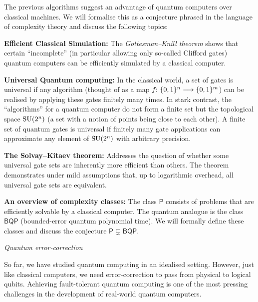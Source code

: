 \documentclass[a4paper, oneside, 12pt]{amsart}
\newcommand*{\Pclass}{\ensuremath{\mathsf{P}}}
\newcommand*{\BQPclass}{\ensuremath{\mathsf{BQP}}}
\begin{document}
The previous algorithms suggest an advantage of quantum computers over classical machines.
We will formalise this as a conjecture phrased in the language of complexity theory and discuss the following topics:
\noindent
\begin{thmlist}
  \item \textbf{Efficient Classical Simulation:}  The \emph{Gottesman--Knill theorem} shows that certain ``incomplete'' (in particular allowing only so-called Clifford gates) quantum computers can be efficiently simulated by a classical computer.
  \item \textbf{Universal Quantum computing:} In the classical world, a set of gates is universal if any algorithm (thought of as a map \(f\from \{0,1\}^{n}\to \{0,1\}^{m}\)) can be realised by applying these gates finitely many times.
  In stark contrast, the ``algorithms'' for a quantum computer do not form a finite set but the topological space \(\operatorname{SU}(2^{n})\)  (\ie a set with a notion of points being close to each other).
  A finite set of quantum gates is universal if finitely many gate applications can approximate any element of \(\operatorname{SU}(2^{n})\) with arbitrary precision.
  \item \textbf{The Solvay--Kitaev theorem:} Addresses the question of whether some universal gate sets are inherently more efficient than others.
  The theorem demonstrates under mild assumptions that, up to logarithmic overhead, all universal gate sets are equivalent.
  \item \textbf{An overview of complexity classes:} The class \(\Pclass\) consists of problems that are efficiently solvable by a classical computer.
  The quantum analogue is the class \(\BQPclass\) (bounded-error quantum polynomial time).
  We will formally define these classes and discuss the conjecture \(\Pclass \subsetneq \BQPclass\).
\end{thmlist}
\bigskip

\begin{center}
  \textit{Quantum error-correction}
\end{center}
\bigskip

So far, we have studied quantum computing in an idealised setting.
However, just like classical computers, we need error-correction to pass from physical to logical qubits.
Achieving fault-tolerant quantum computing is one of the most pressing challenges in the development of real-world quantum computers.
\end{document}
